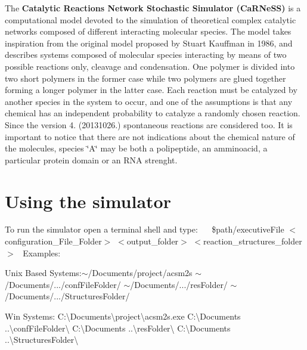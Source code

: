 

 The {\bfseries Catalytic Reactions Network Stochastic Simulator (Ca\+R\+Ne\+S\+S)} is a computational model devoted to the simulation of theoretical complex catalytic networks composed of different interacting molecular species. The model takes inspiration from the original model proposed by Stuart Kauffman in 1986, and describes systems composed of molecular species interacting by means of two possible reactions only, cleavage and condensation. One polymer is divided into two short polymers in the former case while two polymers are glued together forming a longer polymer in the latter case. Each reaction must be catalyzed by another species in the system to occur, and one of the assumptions is that any chemical has an independent probability to catalyze a randomly chosen reaction. Since the version 4. (20131026.) spontaneous reactions are considered too. It is important to notice that there are not indications about the chemical nature of the molecules, species \char`\"{}\+A\char`\"{} may be both a polipeptide, an amminoacid, a particular protein domain or an R\+N\+A strenght.~\newline
~\newline
 \hypertarget{a00002_secUsage}{}\section{Using the simulator}\label{a00002_secUsage}
To run the simulator open a terminal shell and type\+:~\newline
~\newline
 {\ttfamily } \$path/executive\+File {\ttfamily } $<$configuration\+\_\+\+File\+\_\+\+Folder$>$ {\ttfamily } $<$output\+\_\+folder$>$ {\ttfamily } $<$reaction\+\_\+structures\+\_\+folder$>$~\newline
 Examples\+:
\begin{DoxyItemize}
\item Unix Based Systems\+:{\ttfamily $\sim$/\+Documents/project/acsm2s} {\ttfamily $\sim$/\+Documents/}.../conf\+File\+Folder/ {\ttfamily $\sim$/\+Documents/}.../res\+Folder/ {\ttfamily $\sim$/\+Documents/}.../\+Structures\+Folder/
\item Win Systems\+: {\ttfamily C\+:\textbackslash{}Documents\textbackslash{}project\textbackslash{}acsm2s.\+exe} {\ttfamily C\+:\textbackslash{}Documents} ..\textbackslash{}conf\+File\+Folder\textbackslash{} {\ttfamily C\+:\textbackslash{}Documents} ..\textbackslash{}res\+Folder\textbackslash{} {\ttfamily C\+:\textbackslash{}Documents} ..\textbackslash{}Structures\+Folder\textbackslash{}
\end{DoxyItemize}

